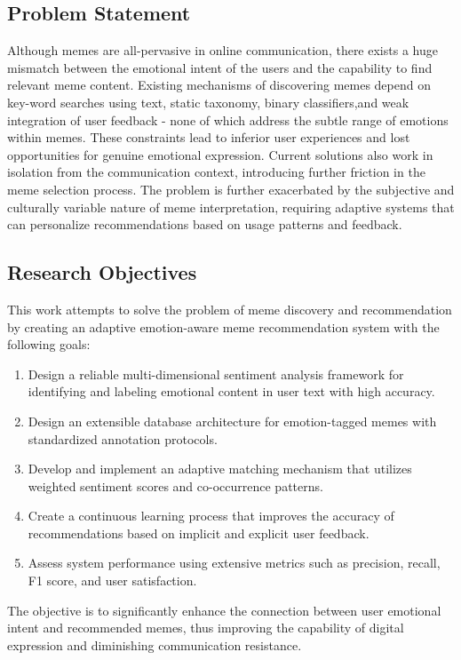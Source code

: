 \documentclass[conference]{IEEEtran}
\begin{document}
\subsection{Problem Statement}
Although memes are all-pervasive in online communication, there exists a huge mismatch between the emotional intent of the users and the capability to find relevant meme content. Existing mechanisms of discovering memes depend on key-word searches using text, static taxonomy, binary classifiers,and weak integration of user feedback - none of which address the subtle range of emotions within memes. These constraints lead to inferior user experiences and lost opportunities for genuine emotional expression. Current solutions also work in isolation from the communication context, introducing further friction in the meme selection process. The problem is further exacerbated by the subjective and culturally variable nature of meme interpretation, requiring adaptive systems that can personalize recommendations based on usage patterns and feedback.

\subsection{Research Objectives}
This work attempts to solve the problem of meme discovery
and recommendation by creating an adaptive emotion-aware
meme recommendation system with the following goals:
\begin{enumerate}
    \item Design a reliable multi-dimensional sentiment analysis framework for identifying and labeling emotional content in user text with high accuracy.
    \item Design an extensible database architecture for emotion-tagged memes with standardized annotation protocols.
    \item Develop and implement an adaptive matching mechanism that utilizes weighted sentiment scores and co-occurrence patterns.
    \item Create a continuous learning process that improves the accuracy of recommendations based on implicit and explicit user feedback.
    \item Assess system performance using extensive metrics such as precision, recall, F1 score, and user satisfaction.
\end{enumerate}

The objective is to significantly enhance the connection between user emotional intent and recommended memes, thus improving the capability of digital expression and diminishing communication resistance.
\end{document}
